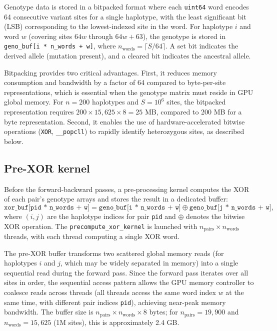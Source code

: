 \documentclass[10pt,letterpaper]{article}
\begin{document}
Genotype data is stored in a bitpacked format where each \texttt{uint64} word encodes 64 consecutive variant sites for a single haplotype, with the least significant bit (LSB) corresponding to the lowest-indexed site in the word. For haplotype $i$ and word $w$ (covering sites $64w$ through $64w+63$), the genotype is stored in \texttt{geno\_buf[i * n\_words + w]}, where $n_{\mathrm{words}} = \lceil S / 64 \rceil$. A set bit indicates the derived allele (mutation present), and a cleared bit indicates the ancestral allele.

Bitpacking provides two critical advantages. First, it reduces memory consumption and bandwidth by a factor of 64 compared to byte-per-site representations, which is essential when the genotype matrix must reside in GPU global memory. For $n = 200$ haplotypes and $S = 10^6$ sites, the bitpacked representation requires $200 \times 15{,}625 \times 8 = 25$ MB, compared to 200 MB for a byte representation. Second, it enables the use of hardware-accelerated bitwise operations (\texttt{XOR}, \texttt{\_\_popcll}) to rapidly identify heterozygous sites, as described below.

\subsection{Pre-XOR kernel}

Before the forward-backward passes, a pre-processing kernel computes the XOR of each pair's genotype arrays and stores the result in a dedicated buffer:
\begin{equation}
\texttt{xor\_buf[pid * n\_words + w]} = \texttt{geno\_buf[i * n\_words + w]} \oplus \texttt{geno\_buf[j * n\_words + w]},
\end{equation}
where $(i, j)$ are the haplotype indices for pair \texttt{pid} and $\oplus$ denotes the bitwise XOR operation. The \texttt{precompute\_xor\_kernel} is launched with $n_{\mathrm{pairs}} \times n_{\mathrm{words}}$ threads, with each thread computing a single XOR word.

The pre-XOR buffer transforms two scattered global memory reads (for haplotypes $i$ and $j$, which may be widely separated in memory) into a single sequential read during the forward pass. Since the forward pass iterates over all sites in order, the sequential access pattern allows the GPU memory controller to coalesce reads across threads (all threads access the same word index $w$ at the same time, with different pair indices \texttt{pid}), achieving near-peak memory bandwidth. The buffer size is $n_{\mathrm{pairs}} \times n_{\mathrm{words}} \times 8$ bytes; for $n_{\mathrm{pairs}} = 19{,}900$ and $n_{\mathrm{words}} = 15{,}625$ (1M sites), this is approximately 2.4 GB.
\end{document}
